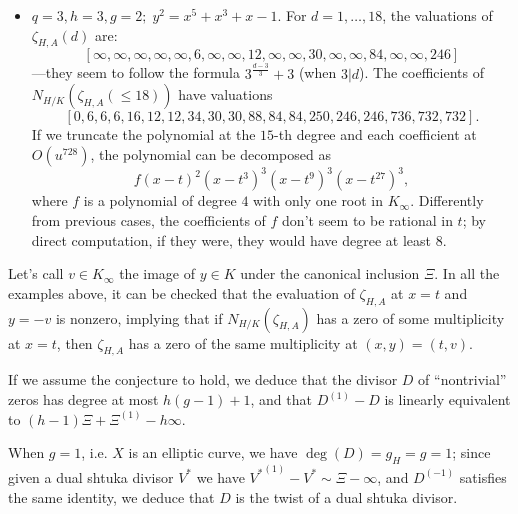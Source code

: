 \documentclass[11pt]{amsart}
\numberwithin{equation}{section}
\begin{document}
\begin{itemize}
    \item$\boxed{q=3,h=3,g=2;\;y^2=x^5+x^3+x-1}$. For $d=1,\dots,18$, the valuations of $\zeta_{H,A}(d)$ are:
    \[[\infty,\infty,\infty,\infty,\infty,6,\infty,\infty,12,\infty,\infty,30,\infty,\infty,84,\infty,\infty,246]\]
    ---they seem to follow the formula $3^{\frac{d-3}{3}}+3$ (when $3|d$). The coefficients of $N_{H/K}(\zeta_{H,A}(\le18))$ have valuations 
    \[[ 0, 6, 6, 6, 16, 12, 12, 34, 30, 30, 88, 84, 84, 250, 246, 246, 736, 732, 732].\]
    If we truncate the polynomial at the $15$-th degree and each coefficient at $O(u^{728})$, the polynomial can be decomposed as \[f(x-t)^2(x-t^3)^3(x-t^9)^3(x-t^{27})^3,\] where $f$
    is a polynomial of degree $4$ with only one root in $K_\infty$. Differently from previous cases, the coefficients of $f$ don't seem to be rational in $t$; by direct computation, if they were, they would have degree at least $8$.
\end{itemize}

Let's call $v\in K_\infty$ the image of $y\in K$ under the canonical inclusion $\Xi$. In all the examples above, it can be checked that the evaluation of $\zeta_{H,A}$ at $x=t$ and $y=-v$ is nonzero, implying that if $N_{H/K}(\zeta_{H,A})$ has a zero of some multiplicity at $x=t$, then $\zeta_{H,A}$ has a zero of the same multiplicity at $(x,y)=(t,v)$.

If we assume the conjecture to hold, we deduce that the divisor $D$ of ``nontrivial'' zeros has degree at most $h (g-1)+1$, and that $D^{(1)}-D$ is linearly equivalent to $(h-1)\Xi+\Xi^{(1)}-h\infty$. 

When $g=1$, i.e. $X$ is an elliptic curve, we have $\deg(D)=g_H=g=1$; since given a dual shtuka divisor $V^*$ we have ${V^*}^{(1)}-V^*\sim\Xi-\infty$, and $D^{(-1)}$ satisfies the same identity, we deduce that $D$ is the twist of a dual shtuka divisor.
\end{document}
